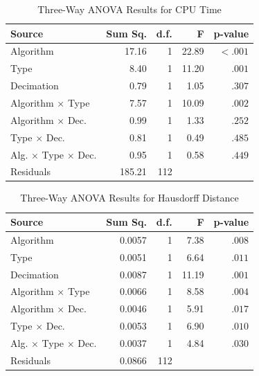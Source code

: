 \begin{table}[h]
\centering
\caption{Summary Statistics (Mean $\pm$ SD)}
\label{tab:summary}
\small
{}
\end{table}

\begin{table}[h]
\centering
\caption{Three-Way ANOVA Results for CPU Time}
\label{tab:anova_time}
\small
\begin{tabular}{lrrrr}
\toprule
\textbf{Source} & \textbf{Sum Sq.} & \textbf{d.f.} & \textbf{F} & \textbf{p-value} \\
\midrule
Algorithm & 17.16 & 1 & 22.89 & $<.001$ \\
Type & 8.40 & 1 & 11.20 & $.001$ \\
Decimation & 0.79 & 1 & 1.05 & $.307$ \\
Algorithm $\times$ Type & 7.57 & 1 & 10.09 & $.002$ \\
Algorithm $\times$ Dec. & 0.99 & 1 & 1.33 & $.252$ \\
Type $\times$ Dec. & 0.81 & 1 & 0.49 & $.485$ \\
Alg. $\times$ Type $\times$ Dec. & 0.95 & 1 & 0.58 & $.449$ \\
Residuals & 185.21 & 112 & & \\
\bottomrule
\end{tabular}
\end{table}

\begin{table}[h]
\centering
\caption{Three-Way ANOVA Results for Hausdorff Distance}
\label{tab:anova_hd}
\small
\begin{tabular}{lrrrr}
\toprule
\textbf{Source} & \textbf{Sum Sq.} & \textbf{d.f.} & \textbf{F} & \textbf{p-value} \\
\midrule
Algorithm & 0.0057 & 1 & 7.38 & $.008$ \\
Type & 0.0051 & 1 & 6.64 & $.011$ \\
Decimation & 0.0087 & 1 & 11.19 & $.001$ \\
Algorithm $\times$ Type & 0.0066 & 1 & 8.58 & $.004$ \\
Algorithm $\times$ Dec. & 0.0046 & 1 & 5.91 & $.017$ \\
Type $\times$ Dec. & 0.0053 & 1 & 6.90 & $.010$ \\
Alg. $\times$ Type $\times$ Dec. & 0.0037 & 1 & 4.84 & $.030$ \\
Residuals & 0.0866 & 112 & & \\
\bottomrule
\end{tabular}
\end{table}

